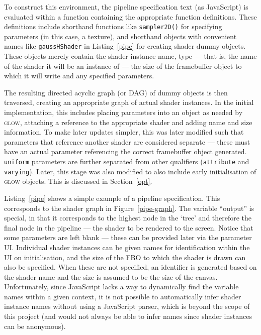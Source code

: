 \documentclass[12pt,twoside,notitlepage]{report}
\begin{document}
To construct this environment, the pipeline specification text (as JavaScript) is evaluated within a function containing the appropriate function definitions. These definitions include shorthand functions like \texttt{sampler2D()} for specifying parameters (in this case, a texture), and shorthand objects with convenient names like \texttt{gaussHShader} in Listing~\ref{pipe} for creating shader dummy objects. These objects merely contain the shader instance name, type --- that is, the name of the shader it will be an instance of --- the size of the framebuffer object to which it will write and any specified parameters. 

The resulting directed acyclic graph (or DAG) of dummy objects is then traversed, creating an appropriate graph of actual shader instances. In the initial implementation, this includes placing parameters into an object as needed by \textsc{glow}, attaching a reference to the appropriate shader and adding name and size information. To make later updates simpler, this was later modified such that parameters that reference another shader are considered separate --- these must have an actual parameter referencing the correct framebuffer object generated. \texttt{uniform} parameters are further separated from other qualifiers (\texttt{attribute} and \texttt{varying}). Later, this stage was also modified to also include early initialisation of \textsc{glow} objects. This is discussed in Section~\ref{opt}.

Listing~\ref{pipe} shows a simple example of a pipeline specification. This corresponds to the shader graph in Figure~\ref{pipe-graph}. The variable ``output'' is special, in that it corresponds to the highest node in the `tree' and therefore the final node in the pipeline --- the shader to be rendered to the screen. Notice that some parameters are left blank --- these can be provided later via the parameter UI. Individual shader instances can be given names for identification within the UI on initialisation, and the size of the FBO to which the shader is drawn can also be specified. When these are not specified, an identifier is generated based on the shader name and the size is assumed to be the size of the canvas. Unfortunately, since JavaScript lacks a way to dynamically find the variable names within a given context, it is not possible to automatically infer shader instance names without using a JavaScript parser, which is beyond the scope of this project (and would not always be able to infer names since shader instances can be anonymous).
\end{document}
